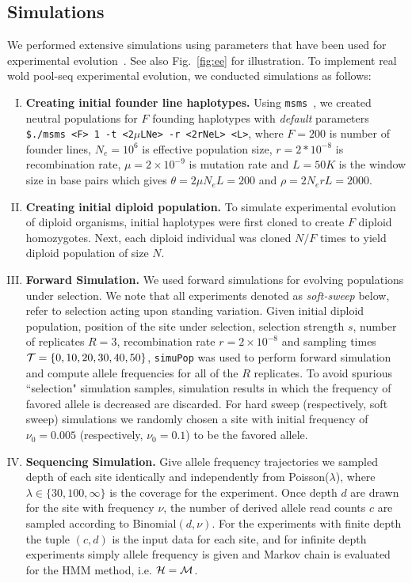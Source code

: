 \subsection{Simulations}
We performed extensive simulations using parameters that have been
used for \dmel experimental
evolution~\cite{kofler2013guide}. See also Fig.~\ref{fig:ee} for
illustration. To implement real wold pool-seq experimental evolution, we 
conducted simulations as follows:
\begin{enumerate}[I.]
\item {\bf Creating initial founder line haplotypes.} Using
  \texttt{msms}~\cite{ewing2010msms}, we created neutral populations for $F$
  founding haplotypes with \emph{default} parameters \texttt{\$./msms
    <F> 1 -t <2$\mu$LNe> -r <2rNeL> <L>}, where $F=200$ is number of
  founder lines, $N_e=10^6$ is effective population size,
  $r=2*10^{-8}$ is recombination rate, $\mu=2\times 10^{-9}$ is
  mutation rate and $L=50K$ is the window size in base pairs which
  gives $\theta=2\mu N_eL=200$ and $\rho=2N_erL=2000$.
  
\item{\bf Creating initial diploid population.} To simulate
  experimental evolution of diploid organisms, initial haplotypes were
  first cloned to create $F$ diploid homozygotes. Next, each diploid
  individual was cloned $N/F$ times to yield diploid population of
  size $N$.

\item{\bf Forward Simulation.} We used forward simulations for
  evolving populations under selection. We note that all experiments
  denoted as \emph{soft-sweep} below, refer to selection acting upon
  standing variation. Given initial diploid population, position of
  the site under selection, selection strength $s$, number of
  replicates $R=3$, recombination rate $r=2\times10^{-8}$ and sampling
  times ${\cal T}=\{0,10,20,30,40,50\}$, \texttt{simuPop} was used to perform
  forward simulation and compute allele frequencies for all of the $R$
  replicates. To avoid spurious ``selection" simulation samples, simulation 
  results in which the frequency of favored allele is decreased are discarded.
  For hard sweep (respectively, soft sweep) simulations we
  randomly chosen a site with initial frequency of $\nu_0=0.005$
  (respectively, $\nu_0=0.1$) to be the favored allele.
  \item{\bf Sequencing Simulation.} Give allele frequency trajectories we 
  sampled depth of each site  identically and independently from 
  Poisson($\lambda$), where $\lambda \in \{30,100,\infty\}$ is the coverage for 
  the experiment. Once depth $d$ are drawn for the site with frequency $\nu$, 
  the number of derived allele read counts $c$ are sampled according to 
  Binomial$(d,\nu)$. For the experiments with finite depth the tuple $(c,d)$ is 
  the input data for each site, and for infinite depth experiments simply 
  allele frequency is given and Markov chain is evaluated for the HMM method, 
  i.e. ${\cal H}={\cal M}$.
\end{enumerate}
